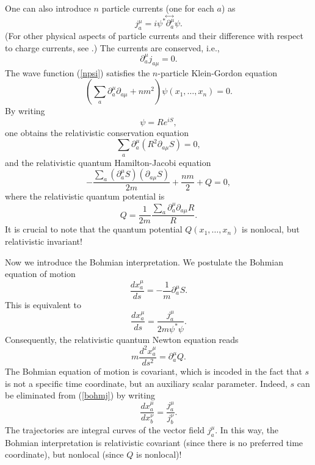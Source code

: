 \documentclass[12pt]{article} %
\begin{document}
One can also introduce $n$ particle currents (one for each $a$) as
\begin{equation}
j^{\mu}_a=i\psi^* \!\stackrel{\leftrightarrow\;}{\partial^{\mu}_a}\! \psi .
\end{equation}
(For other physical aspects of particle currents and their difference 
with respect to charge currents, see \cite{nikolplb,nikolijmpd,nikolgrg}.)
The currents are conserved, i.e., 
\begin{equation}
\partial^{\mu}_a j_{a\mu}=0 .
\end{equation}
The wave function (\ref{npsi}) satisfies the
$n$-particle Klein-Gordon equation
\begin{equation}
\left( \sum_a\partial_a^{\mu}\partial_{a\mu}+nm^2 \right) 
\psi(x_1,\ldots ,x_n)=0 .
\end{equation}
By writing
\begin{equation}
\psi=Re^{iS} ,
\end{equation}
one obtains the
relativistic conservation equation
\begin{equation}
\sum_a\partial_a^{\mu}(R^2\partial_{a\mu}S)=0,
\end{equation}
and the
relativistic quantum Hamilton-Jacobi equation
\begin{equation}
-\frac{\sum_a(\partial_a^{\mu}S)(\partial_{a\mu}S)}{2m} +\frac{nm}{2} +Q=0 ,
\end{equation}
where the
relativistic quantum potential is
\begin{equation}
Q=\frac{1}{2m}\frac{\sum_a\partial_a^{\mu}\partial_{a\mu}R}{R} .
\end{equation}
It is crucial to note that the quantum potential
$Q(x_1,\ldots ,x_n)$ is nonlocal, but relativistic invariant! 

Now we introduce the Bohmian interpretation. We postulate
the Bohmian equation of motion 
\begin{equation}
\frac{dx_a^{\mu}}{ds} = -\frac{1}{m}\partial_a^{\mu}S . 
\end{equation}
This is equivalent to
\begin{equation}\label{bohmj}
\frac{dx_a^{\mu}}{ds} = \frac{j_a^{\mu}}{2m\psi^*\psi} .
\end{equation}
Consequently, the
relativistic quantum Newton equation reads
\begin{equation}
m\frac{d^2x_a^{\mu}}{ds^2}=\partial_a^{\mu}Q .
\end{equation}
The Bohmian equation of motion is covariant, which is
incoded in the fact that
$s$ is not a specific time coordinate, but an auxiliary 
scalar parameter.
Indeed, $s$ can be eliminated 
from (\ref{bohmj}) by writing
\begin{equation}
\frac{dx_a^{\mu}}{dx_b^{\nu}} = \frac{j_a^{\mu}}{j_b^{\nu}} .
\end{equation}
The trajectories are integral curves of the vector field 
${j_a^{\mu}}$. In this way, 
the Bohmian interpretation is relativistic covariant (since there is no 
preferred time coordinate), but nonlocal (since $Q$ is nonlocal)! 
\end{document}
